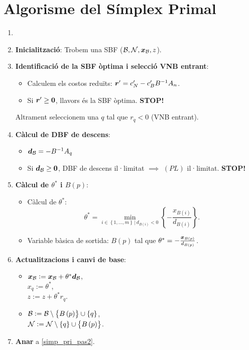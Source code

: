\section{Algorisme del Símplex Primal}
\begin{alg}\label{alg:asp}
    \begin{enumerate}
        \item[]
        \item {\bf Inicialització}: Trobem una SBF ($\mathcal{B}, \mathcal{N}, \boldsymbol{x}_{\mathcal{B}}, z$).
        \item \label{simp_pri_pas2} {\bf Identificació de la SBF òptima i selecció VNB entrant}:
            \begin{itemize}
                \item Calculem els costos reduïts: $\boldsymbol{r}' = c_N' - c_B'B^{-1}A_n$.
                \item Si $\boldsymbol{r}' \geq \boldsymbol{0}$, llavors és la SBF òptima. {\bf STOP!}
            \end{itemize}
            Altrament seleccionem una $q$ tal que $r_q < 0$ (VNB entrant).
        \item {\bf Càlcul de DBF de descens}:
            \begin{itemize}
                \item $\boldsymbol{d}_{\mathcal{B}} = -B^{-1}A_q$
                \item Si $\boldsymbol{d}_{\mathcal{B}} \geq \boldsymbol{0}$, DBF de descens il·limitat $\implies$ $\left(PL\right)$ il·limitat. {\bf STOP!}
            \end{itemize}
        \item {\bf Càlcul de $\theta^*$ i $B\left(p\right)$}:
            \begin{itemize}
                \item Càlcul de $\theta^*$: 
                    \[\theta^* = \min_{i \in \left\{ 1, \dots, m \right\} \,|\, d_{B\left(i\right)} < 0} \left\{-\frac{x_{B\left(i\right)}}{d_{B\left(i\right)}} \right\}.\]
                \item Variable bàsica de sortida: $B\left(p\right)$ tal que $\theta^* = -\frac{\boldsymbol{x}_{B\left(p\right)}}{d_{B\left(p\right)}}$.
            \end{itemize}
        \item {\bf Actualitzacions i canvi de base}:
            \begin{itemize}
                \item $\boldsymbol{x}_{\mathcal{B}} := \boldsymbol{x}_{\mathcal{B}} + \theta^*\boldsymbol{d}_{\mathcal{B}}$, \\
                    $x_q := \theta^*$, \\
                    $z := z + \theta^* r_q$.
                \item $\mathcal{B} := \mathcal{B} \setminus \left\{B\left(p\right)\right\} \cup \left\{q\right\}$, \\
                    $\mathcal{N} := \mathcal{N} \setminus \left\{q\right\} \cup \left\{B\left(p\right)\right\}$.
            \end{itemize}
        \item {\bf Anar} a \ref{simp_pri_pas2}.
    \end{enumerate}
\end{alg}
